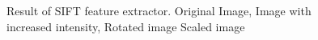 \begin{figure}[H]
\begin{center}
\end{center}
\caption[Result of SIFT]{Result of SIFT feature extractor. Original Image, Image with increased intensity, Rotated image Scaled image}%
\end{figure}


